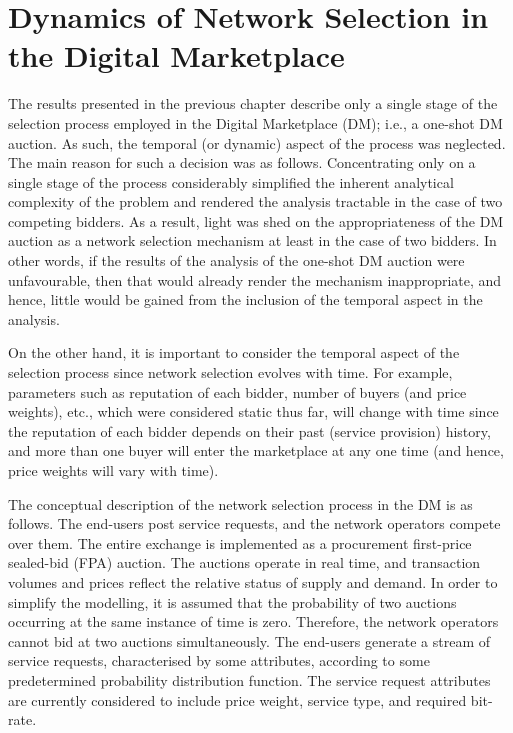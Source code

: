 \chapter{Dynamics of Network Selection in the Digital Marketplace} %
\label{cha:dynamics_of_network_selection_in_the_digital_marketplace}

\minitoc
\vspace{10mm}

The results presented in the previous chapter describe only a single stage of the selection process employed in the Digital Marketplace (DM); i.e., a one-shot DM auction. As such, the temporal (or dynamic) aspect of the process was neglected. The main reason for such a decision was as follows. Concentrating only on a single stage of the process considerably simplified the inherent analytical complexity of the problem and rendered the analysis tractable in the case of two competing bidders. As a result, light was shed on the appropriateness of the DM auction as a network selection mechanism at least in the case of two bidders. In other words, if the results of the analysis of the one-shot DM auction were unfavourable, then that would already render the mechanism inappropriate, and hence, little would be gained from the inclusion of the temporal aspect in the analysis.

On the other hand, it is important to consider the temporal aspect of the selection process since network selection evolves with time. For example, parameters such as reputation of each bidder, number of buyers (and price weights), etc., which were considered static thus far, will change with time since the reputation of each bidder depends on their past (service provision) history, and more than one buyer will enter the marketplace at any one time (and hence, price weights will vary with time).

The conceptual description of the network selection process in the DM is as follows. The end-users post service requests, and the network operators compete over them. The entire exchange is implemented as a procurement first-price sealed-bid (FPA) auction. The auctions operate in real time, and transaction volumes and prices reflect the relative status of supply and demand. In order to simplify the modelling, it is assumed that the probability of two auctions occurring at the same instance of time is zero. Therefore, the network operators cannot bid at two auctions simultaneously. The end-users generate a stream of service requests, characterised by some attributes, according to some predetermined probability distribution function. The service request attributes are currently considered to include price weight, service type, and required bit-rate.

